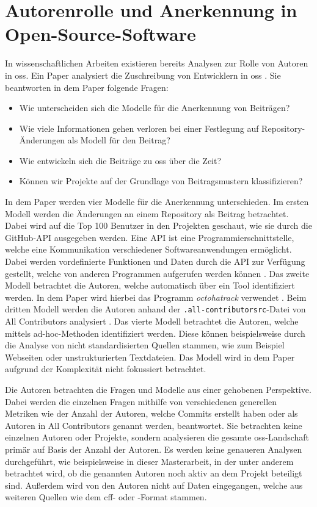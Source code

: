 \section{Autorenrolle und Anerkennung in Open-Source-Software}
\label{sec:autorenrolle-oss}
In wissenschaftlichen Arbeiten existieren bereits Analysen zur Rolle von Autoren in \gls{oss}.
Ein Paper analysiert die Zuschreibung von Entwicklern in \gls{oss} \autocite{young_which_2021}.
Sie beantworten in dem Paper folgende Fragen:

\begin{itemize}
  \item Wie unterscheiden sich die Modelle für die Anerkennung von Beiträgen?
  \item Wie viele Informationen gehen verloren bei einer Festlegung auf Repository-Änderungen als Modell für den Beitrag?
  \item Wie entwickeln sich die Beiträge zu \gls{oss} über die Zeit?
  \item Können wir Projekte auf der Grundlage von Beitragsmustern klassifizieren?
\end{itemize}

In dem Paper werden vier Modelle für die Anerkennung unterschieden.
Im ersten Modell werden die Änderungen an einem Repository als Beitrag betrachtet.
Dabei wird auf die Top 100 Benutzer in den Projekten geschaut, wie sie durch die GitHub-API ausgegeben werden.
Eine API ist eine Programmierschnittstelle, welche eine Kommunikation verschiedener Softwareanwendungen ermöglicht.
Dabei werden vordefinierte Funktionen und Daten durch die API zur Verfügung gestellt, welche von anderen Programmen aufgerufen werden können \autocite{github_about_2022}.
Das zweite Modell betrachtet die Autoren, welche automatisch über ein Tool identifiziert werden.
In dem Paper wird hierbei das Programm \emph{octohatrack} verwendet \autocites{young_which_2021}{mclaughlin_octohatrack_2020}.
Beim dritten Modell werden die Autoren anhand der \texttt{.all-contributorsrc}-Datei von \glqq All Contributors\grqq{} analysiert \autocites{young_which_2021}{bolam_recognize_2024}.
Das vierte Modell betrachtet die Autoren, welche mittels ad-hoc-Methoden identifiziert werden.
Diese können beispielsweise durch die Analyse von nicht standardisierten Quellen stammen, wie zum Beispiel Webseiten oder unstrukturierten Textdateien.
Das Modell wird in dem Paper aufgrund der Komplexität nicht fokussiert betrachtet.

Die Autoren betrachten die Fragen und Modelle aus einer gehobenen Perspektive.
Dabei werden die einzelnen Fragen mithilfe von verschiedenen generellen Metriken wie der Anzahl der Autoren, welche Commits erstellt haben oder als Autoren in \glqq All Contributors\grqq{} genannt werden, beantwortet.
Sie betrachten keine einzelnen Autoren oder Projekte, sondern analysieren die gesamte \gls{oss}-Landschaft primär auf Basis der Anzahl der Autoren.
Es werden keine genaueren Analysen durchgeführt, wie beispielsweise in dieser Masterarbeit, in der unter anderem betrachtet wird, ob die genannten Autoren noch aktiv an dem Projekt beteiligt sind.
Außerdem wird von den Autoren nicht auf Daten eingegangen, welche aus weiteren Quellen wie dem \gls{cff}- oder -Format stammen.
